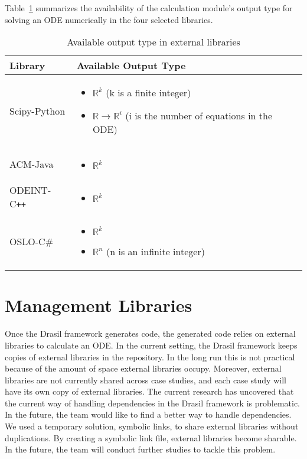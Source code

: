 Table~\ref{tab_outputtype} summarizes the availability of the calculation module's output type for solving an ODE numerically in the four selected libraries.
\begin{table}[ht]
\centering
\begin{tabular}{p{} | p{} } \hline
    \textbf{Library}&\textbf{Available Output Type}\\
    \toprule
    Scipy-Python & 
    \begin{itemize}[wide]
    \item $\mathbb{R}^k$ (k is a finite integer)
    \item $\mathbb{R} \rightarrow \mathbb{R}^i$ (i is the number of equations in the ODE)
    \end{itemize}  \\ \hline
    ACM-Java &     
    \begin{itemize}[wide]
    \item $\mathbb{R}^k$
    \end{itemize}  \\ \hline
    ODEINT-C\texttt{++} & 
    \begin{itemize}[wide]
    \item $\mathbb{R}^k$
    \end{itemize}\\ \hline
    OSLO-C\# & 
    \begin{itemize}[wide]
    \item $\mathbb{R}^k$
    \item $\mathbb{R}^n$ (n is an infinite integer)
    \end{itemize} \\
    \bottomrule	
\end{tabular}	
\caption{Available output type in external libraries}	
\label{tab_outputtype}
\end{table}

\section{Management Libraries}
Once the Drasil framework generates code, the generated code relies on external libraries to calculate an ODE. In the current setting, the Drasil framework keeps copies of external libraries in the repository. In the long run this is not practical because of the amount of space external libraries occupy. Moreover, external libraries are not currently shared across case studies, and each case study will have its own copy of external libraries. The current research has uncovered that the current way of handling dependencies in the Drasil framework is problematic. In the future, the team would like to find a better way to handle dependencies. We used a temporary solution, symbolic links, to share external libraries without duplications. By creating a symbolic link file, external libraries become sharable. In the future, the team will conduct further studies to tackle this problem.
